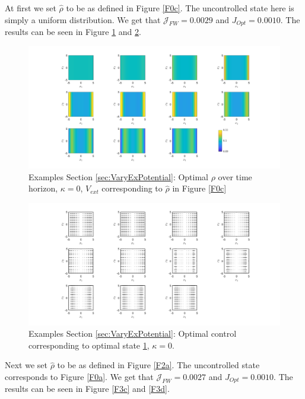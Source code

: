 \documentclass[11pt, a4paper]{article}
\theoremstyle{definition}
\newcommand{\hr}{\widehat \rho}
\begin{document}
At first we set $\hr$ to be as defined in Figure \ref{F0c}. The uncontrolled state here is simply a uniform distribution. We get that $\mathcal J_{FW} = 0.0029$ and $J_{Opt} = 0.0010$. The results can be seen in Figure \ref{F3a} and \ref{F3b}.

\begin{figure}[h]
	\centering
	\includegraphics[scale=0.35]{rhoOptk0V.png}
	\caption{Examples Section \ref{sec:VaryExPotential}: Optimal $\rho$ over time horizon, $\kappa = 0$, $V_{ext}$ corresponding to $\hr$ in Figure \ref{F0c}} 
	\label{F3a}
\end{figure}
\begin{figure}[h]
	\centering
	\includegraphics[scale=0.35]{ConOptk0V.png}
	\caption{Examples Section \ref{sec:VaryExPotential}: Optimal control corresponding to optimal state \ref{F3a}, $\kappa = 0$.} 
	\label{F3b}
\end{figure}

Next we set $\hr$ to be as defined in Figure \ref{F2a}. The uncontrolled state corresponds to Figure \ref{F0a}. We get that $\mathcal J_{FW} = 0.0027$ and $J_{Opt} = 0.0010$. The results can be seen in Figure \ref{F3c} and \ref{F3d}.
\end{document}
